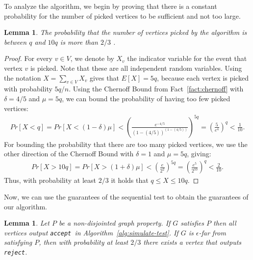 \documentclass[11pt]{article}
\newtheorem{lemma}[theorem]{Lemma}
\newcommand{\accept}{\texttt{accept}}
\newcommand{\reject}{\texttt{reject}}
\begin{document}
To analyze the algorithm, we begin by proving that there is a constant probability for the number of picked vertices to be sufficient and not too large.
\begin{lemma}
\label{lem:q}
The probability that the number of vertices picked by the algorithm is between $q$ and $10q$ is more than $2/3$ .
\end{lemma}
\begin{proof}
For every $v \in V$, we denote by $X_v$ the indicator variable for the event that vertex $v$ is picked.
Note that these are all independent random variables. Using the notation $X = \sum_{v\in V}X_v$ gives that $E[X]=5q$, because each vertex is picked with probability $5q/n$.
Using the Chernoff Bound from Fact~\ref{fact:chernoff} with $\delta=4/5$ and $\mu = 5q$, we can bound the probability of having too few picked vertices:
\begin{align*}
Pr[X < q] = Pr[X < (1-\delta)\mu] < (\frac{e^{-4/5}}{(1-(4/5))^{(1-(4/5))}})^{5q} = (\frac{5}{e^4})^q < \frac{1}{10}.
\end{align*}
For bounding the probability that there are too many picked vertices, we use the other direction of the Chernoff Bound with $\delta=1$ and $\mu = 5q$, giving:
\begin{align*}
Pr[X > 10q]  = Pr[X > (1+\delta)\mu] < (\frac{e}{2^2})^{5q} = (\frac{e^5}{2^{10}})^q < \frac{2}{10}.
\end{align*}
Thus, with probability at least $2/3$ it holds that $q \leq X \leq 10q$.
\end{proof}


Now, we can use the guarantees of the sequential test to obtain the guarantees of our algorithm.
\begin{lemma}
\label{lemma:correctness}
Let $P$ be a non-disjointed graph property. If $G$ satisfies $P$ then all vertices output \accept ~in Algorithm~\ref{alg:simulate-test}. If $G$ is $\epsilon$-far from satisfying $P$, then with probability at least $2/3$ there exists a vertex that outputs \reject.
\end{lemma}
	
\end{document}
